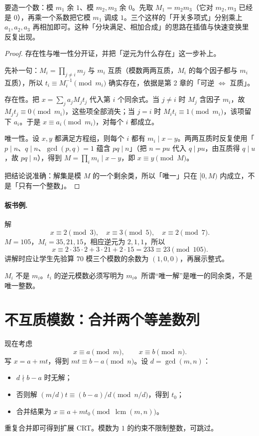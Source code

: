 \documentclass[UTF8,a4paper,11pt,twoside,openright,fontset=fandol]{ctexbook}
\theoremstyle{definition}
\newcommand{\lcm}{\operatorname{lcm}}
\begin{document}
\begin{tip}
要造一个数：模 $m_1$ 余 $1$、模 $m_2,m_3$ 余 $0$。先取 $M_1=m_2m_3$（它对 $m_2,m_3$ 已经是 $0$），再乘一个系数把它模 $m_1$ 调成 $1$。三个这样的「开关多项式」分别乘上 $a_1,a_2,a_3$ 再相加即可。这种「分块满足、相加合成」的思路在插值与快速变换里反复出现。
\end{tip}

\begin{proof}
存在性与唯一性分开证，并把「逆元为什么存在」这一步补上。

先补一句：$M_i=\prod_{j\ne i}m_j$ 与 $m_i$ 互质（模数两两互质，$M_i$ 的每个因子都与 $m_i$ 互质），所以 $t_i\equiv M_i^{-1}\pmod{m_i}$ 确实存在，依据是第 2 章的「可逆 $\iff$ 互质」。

存在性。把 $x=\sum_j a_jM_jt_j$ 代入第 $i$ 个同余式。当 $j\ne i$ 时 $M_j$ 含因子 $m_i$，故 $M_jt_j\equiv0\pmod{m_i}$，这些项全部消失；当 $j=i$ 时 $M_it_i\equiv1\pmod{m_i}$，该项留下 $a_i$。于是 $x\equiv a_i\pmod{m_i}$，对每个 $i$ 都成立。

唯一性。设 $x,y$ 都满足方程组，则每个 $i$ 都有 $m_i\mid x-y$。两两互质时反复使用「$p\mid n$、$q\mid n$、$\gcd(p,q)=1$ 蕴含 $pq\mid n$」（把 $n=pu$ 代入 $q\mid pu$，由互质得 $q\mid u$，故 $pq\mid n$），得到 $M=\prod_i m_i\mid x-y$，即 $x\equiv y\pmod M$。

把结论说准确：解集是模 $M$ 的一个剩余类，所以「唯一」只在 $[0,M)$ 内成立，不是「只有一个整数」。
\end{proof}

\paragraph{板书例.} 解
\[
 x\equiv2\pmod3,\quad x\equiv3\pmod5,\quad x\equiv2\pmod7.
\]
$M=105$，$M_i=35,21,15$，相应逆元为 $2,1,1$，所以
\[
 x\equiv2\cdot35\cdot2+3\cdot21+2\cdot15=233\equiv23\pmod{105}.
\]
讲解时应让学生先验算 $70$ 模三个模数的余数为 $(1,0,0)$，再展示整式。
\begin{pitfall}
$M_i$ 不是 $m_i$。$t_i$ 的逆元模数必须写明为 $m_i$。所谓“唯一解”是唯一的同余类，不是唯一整数。
\end{pitfall}


\section{不互质模数：合并两个等差数列}
现在考虑
\[
 x\equiv a\pmod m,\qquad x\equiv b\pmod n.
\]
写 $x=a+mt$，得到 $mt\equiv b-a\pmod n$。设 $d=\gcd(m,n)$：
\begin{itemize}
\item $d\nmid b-a$ 时无解；
\item 否则解 $(m/d)t\equiv(b-a)/d\pmod{n/d}$，得到 $t_0$；
\item 合并结果为 $x\equiv a+mt_0\pmod{\lcm(m,n)}$。
\end{itemize}
重复合并即可得到扩展 CRT。模数为 $1$ 的约束不限制整数，可跳过。
\end{document}
